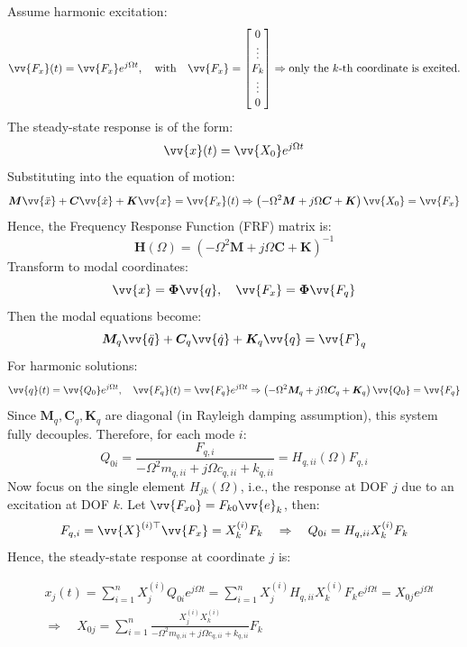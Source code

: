 Assume harmonic excitation:
\[
\vv{F_x}(t) = \vv{F_{x}} e^{j \Omega t}, \quad \text{with} \quad \vv{F_{x}} =
\begin{bmatrix}
0 \\
\vdots \\
F_k \\
\vdots \\
0
\end{bmatrix}
\Rightarrow
\text{only the \( k \)-th coordinate is excited.}
\]
The steady-state response is of the form:
\[
\vv{x}(t) = \vv{X_0} e^{j \Omega t}
\]
Substituting into the equation of motion:
\[
\boldsymbol{M} \vv{\ddot{x}} + \boldsymbol{C} \vv{\dot{x}} + \boldsymbol{K} \vv{x} = \vv{F_x}(t)
\Rightarrow
\left( -\Omega^2 \boldsymbol{M} + j \Omega \boldsymbol{C} + \boldsymbol{K} \right) \vv{X_0} = \vv{F_{x}}
\]
Hence, the Frequency Response Function (FRF) matrix is:
\[
\boldsymbol{H}(\Omega) = \left( -\Omega^2 \boldsymbol{M} + j \Omega \boldsymbol{C} + \boldsymbol{K} \right)^{-1}
\]
Transform to modal coordinates:
\[
\vv{x} = \boldsymbol{\Phi} \vv{q}, \quad \vv{F_x} = \boldsymbol{\Phi} \vv{F_q}
\]
Then the modal equations become:
\[
\boldsymbol{M}_q \vv{\ddot{q}} + \boldsymbol{C}_q \vv{\dot{q}} + \boldsymbol{K}_q \vv{q} = \vv{F}_q
\]
For harmonic solutions:
\[
\vv{q}(t) = \vv{Q_0} e^{j \Omega t}, \quad \vv{F_q}(t) = \vv{F_q} e^{j \Omega t}
\Rightarrow
\left( -\Omega^2 \boldsymbol{M}_q + j \Omega \boldsymbol{C}_q + \boldsymbol{K}_q \right) \vv{Q_0} = \vv{F_q}
\]
Since \( \boldsymbol{M}_q, \boldsymbol{C}_q, \boldsymbol{K}_q \) are diagonal (in Rayleigh damping assumption), this system fully decouples. Therefore, for each mode \( i \):
\[
Q_{0i} = \frac{F_{q,i}}{-\Omega^2 m_{q,ii} + j \Omega c_{q,ii} + k_{q,ii}} = H_{q,ii}(\Omega) F_{q,i}
\]
Now focus on the single element \( H_{jk}(\Omega) \), i.e., the response at DOF \( j \) due to an excitation at DOF \( k \). Let \( \vv{F_{x0}} = F_{k0}  \vv{e}_k \), then:
\[
F_{q,i} = \vv{X}^{(i)\top} \vv{F_{x}} = X_k^{(i)} F_{k}
\quad \Rightarrow \quad
Q_{0i} = H_{q,ii} X_k^{(i)} F_{k}
\]
Hence, the steady-state response at coordinate \( j \) is:

\begin{align*}
&x_j(t) = \sum_{i=1}^n X_j^{(i)} Q_{0i} e^{j \Omega t}
= \sum_{i=1}^n X_j^{(i)} H_{q,ii} X_k^{(i)} F_{k} e^{j \Omega t}
= X_{0j} e^{j \Omega t} \\ 
&\Rightarrow \quad
X_{0j} = \sum_{i=1}^n \frac{X_j^{(i)} X_k^{(i)}}{-\Omega^2 m_{q,ii} + j \Omega c_{q,ii} + k_{q,ii}} F_{k}
\end{align*}

